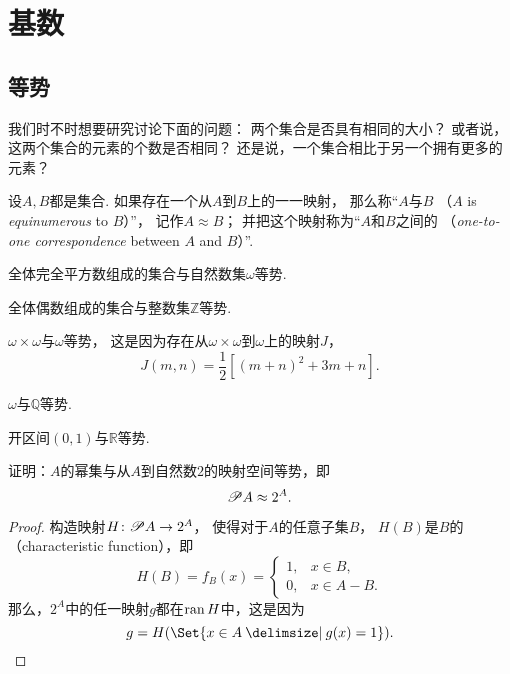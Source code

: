 \section{基数}
\subsection{等势}
我们时不时想要研究讨论下面的问题：
两个集合是否具有相同的大小？
或者说，这两个集合的元素的个数是否相同？
还是说，一个集合相比于另一个拥有更多的元素？

\begin{definition}
设\(A,B\)都是集合.
如果存在一个从\(A\)到\(B\)上的一一映射，
那么称“\(A\)与\(B\) （\(A\) is \emph{equinumerous} to \(B\)）”，
记作\(A \approx B\)；
并把这个映射称为“\(A\)和\(B\)之间的%
（\emph{one-to-one correspondence} between \(A\) and \(B\)）”.
\end{definition}

\begin{example}
全体完全平方数组成的集合与自然数集\(\omega\)等势.
\end{example}

\begin{example}
全体偶数组成的集合与整数集\(\mathbb{Z}\)等势.
\end{example}

\begin{example}
\(\omega\times\omega\)与\(\omega\)等势，
这是因为存在从\(\omega\times\omega\)到\(\omega\)上的映射\(J\)，
\[
	J(m,n) = \frac{1}{2} [(m+n)^2+3m+n].
\]
\end{example}

\begin{example}
\(\omega\)与\(\mathbb{Q}\)等势.
\end{example}

\begin{example}
开区间\((0,1)\)与\(\mathbb{R}\)等势.
\end{example}

\begin{example}
证明：\(A\)的幂集与从\(A\)到自然数\(2\)的映射空间等势，即\begin{equation}
	\mathscr{P} A \approx 2^A.
\end{equation}
\begin{proof}
构造映射\(H\colon \mathscr{P} A \to 2^A\)，
使得对于\(A\)的任意子集\(B\)，
\(H(B)\)是\(B\)的（characteristic function），即\[
	H(B) = f_B(x) = \left\{ \begin{array}{cl}
		1, & x \in B, \\
		0, & x \in A - B.
	\end{array} \right.
\]
那么，\(2^A\)中的任一映射\(g\)都在\(\operatorname{ran} H\)中，这是因为\[
	g = H(\Set{ x \in A \given g(x) = 1 }).
	\qedhere
\]
\end{proof}
\end{example}

